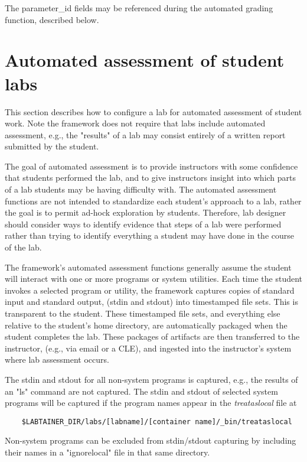 \documentclass{article}
\begin{document}
The parameter\_id fields may be referenced during the automated grading function, described below. 


\section{Automated assessment of student labs}
This section describes how to configure a lab for automated assessment of student work.
Note the framework does not require that labs include automated assessment, e.g., the
"results" of a lab may consist entirely of a written report submitted by the student.

The goal of automated assessment is to provide instructors with some confidence that 
students performed the lab, and to give instructors insight into which parts
of a lab students may be having difficulty with.  The automated assessment functions are
not intended to standardize each student's approach to a lab, rather the goal is to permit
ad-hock exploration by students.  Therefore, lab designer should consider ways to identify
evidence that steps of a lab were performed rather than trying to identify everything a student
may have done in the course of the lab.

The framework's automated assessment functions generally assume the student will interact with one or
more programs or system utilities.  Each time the student invokes a selected program or utility, the 
framework captures copies of standard input and standard output, (stdin and stdout) into timestamped file sets.
This is transparent to the student.  These timestamped file sets, and everything else relative to
the student's home directory, are automatically packaged when the student completes the lab.
These packages of artifacts are then transferred to the instructor, (e.g., via email or a CLE), and 
ingested into the instructor's system where lab assessment occurs.

The stdin and stdout for all non-system programs is captured, e.g., the results of an "ls" command
are not captured.  The stdin and stdout of selected system programs will be captured if the program
names appear in the \textit{treataslocal} file at
\begin{verbatim}
    $LABTAINER_DIR/labs/[labname]/[container name]/_bin/treataslocal
\end{verbatim}
Non-system programs can be excluded from stdin/stdout capturing by including their names in
a "ignorelocal" file in that same directory.
\end{document}
